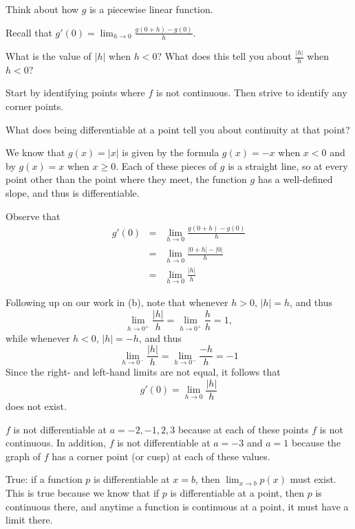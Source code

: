 \begin{bighint}
\ba
	\item Think about how $g$ is a piecewise linear function.
	\item Recall that $g'(0) = \lim_{h \to 0} \frac{g(0 + h) - g(0)}{h}.$
	\item What is the value of $|h|$ when $h < 0$?  What does this tell you about $\frac{|h|}{h}$ when $h < 0$?
	\item Start by identifying points where $f$ is not continuous.  Then strive to identify any corner points.
	\item What does being differentiable at a point tell you about continuity at that point?	
\ea
\end{bighint}
\begin{activitySolution}
\ba
	\item We know that $g(x) = |x|$ is given by the formula $g(x) = -x$ when $x < 0$ and by $g(x) = x$ when $x \ge 0$.  Each of these pieces of $g$ is a straight line, so at every point other than the point where they meet, the function $g$ has a well-defined slope, and thus is differentiable. 
	\item Observe that
	\begin{eqnarray*}
		g'(0) & = & \lim_{h \to 0} \frac{g(0+h)-g(0)}{h} \\
			& = & \lim_{h \to 0} \frac{|0+h|-|0|}{h} \\
			& = & \lim_{h \to 0} \frac{|h|}{h}
	\end{eqnarray*}
	\item Following up on our work in (b), note that whenever $h > 0$, $|h| = h$, and thus
	$$\lim_{h \to 0^+} \frac{|h|}{h} = \lim_{h \to 0^+} \frac{h}{h} = 1,$$
	while whenever $h < 0$, $|h| = -h$, and thus
	$$\lim_{h \to 0^-} \frac{|h|}{h} = \lim_{h \to 0^-} \frac{-h}{h} = -1$$
	Since the right- and left-hand limits are not equal, it follows that 
	$$g'(0) =  \lim_{h \to 0} \frac{|h|}{h}$$
	does not exist.

	\item $f$ is not differentiable at $a = -2, -1, 2, 3$ because at each of these points $f$ is not continuous.  In addition, $f$ is not differentiable at $a = -3$ and $a = 1$ because the graph of $f$ has a corner point (or cusp) at each of these values.  
	\item True: if a function $p$ is differentiable at $x = b$, then $\lim_{x \to b} p(x)$ must exist.  This is true because we know that if $p$ is differentiable at a point, then $p$ is continuous there, and anytime a function is continuous at a point, it must have a limit there.	
\ea
\end{activitySolution}
\aftera